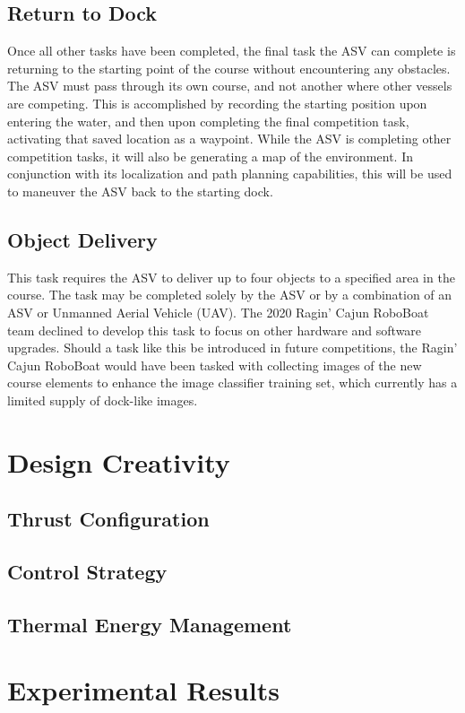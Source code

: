 \documentclass[letterpaper, 10 pt, conference]{ieeeconf}
\begin{document}
\subsection{Return to Dock}
\label{ReturnToDock}
Once all other tasks have been completed, the final task the ASV can complete is returning to the starting point of the course without encountering any obstacles. The ASV must pass through its own course, and not another where other vessels are competing. This is accomplished by recording the starting position upon entering the water, and then upon completing the final competition task, activating that saved location as a waypoint. While the ASV is completing other competition tasks, it will also be generating a map of the environment. In conjunction with its localization and path planning capabilities, this will be used to maneuver the ASV back to the starting dock.

\subsection{Object Delivery}
\label{ObjectDelivery}
This task requires the ASV to deliver up to four objects to a specified area in the course. The task may be completed solely by the ASV or by a combination of an ASV or Unmanned Aerial Vehicle (UAV). The 2020 Ragin' Cajun RoboBoat team declined to develop this task to focus on other hardware and software upgrades. Should a task like this be introduced in future competitions, the Ragin' Cajun RoboBoat would have been tasked with collecting images of the new course elements to enhance the image classifier training set, which currently has a limited supply of dock-like images.

\section{Design Creativity}
\subsection{Thrust Configuration}
\subsection{Control Strategy}
\subsection{Thermal Energy Management}
\section{Experimental Results}
\end{document}
